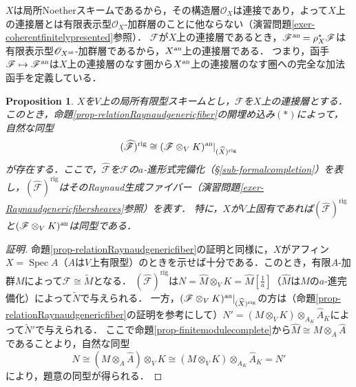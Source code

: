 \documentclass[a4paper,12pt, dvipdfmx]{jsbook}
\def\O{\mathscr{O}}
\def\til#1{\widetilde{#1}}%
\def\rig{\mathop{\mathrm{rig}}\nolimits}
\def\Spec{\mathop{\mathrm{Spec}}\nolimits}
\def\an{\textsl{an}}
\theoremstyle{plain}
\newtheorem{prop}[thm]{\bfseries Proposition}
\theoremstyle{definition}
\begin{document}
$X$は局所Noetherスキームであるから，その構造層$\O_X$は連接であり，よって$X$上の連接層とは有限表示型$\O_X$-加群層のことに他ならない（演習問題\ref{exer-coherentfinitelypresented}参照）．
$\mathscr{F}$が$X$上の連接層であるとき，$\mathscr{F}^{\an}=\rho^{\ast}_X\mathscr{F}$は有限表示型$\O_{X^{\an}}$-加群層であるから，$X^{\an}$上の連接層である．
つまり，函手$\mathscr{F}\mapsto\mathscr{F}^{\an}$は$X$上の連接層のなす圏から$X^{\an}$上の連接層のなす圏への完全な加法函手を定義している．

\begin{prop}\label{prop-relationRaynaudgenericfibersheaf}{\rm 
$X$を$V$上の局所有限型スキームとし，$\mathscr{F}$を$X$上の連接層とする．
このとき，命題\ref{prop-relationRaynaudgenericfiber}の開埋め込み$(\ast)$によって，自然な同型
$$
(\widehat{\mathscr{F}})^{\rig}\cong(\mathscr{F}\otimes_VK)^{\an}|_{(\widehat{X})^{\rig}}
$$
が存在する．ここで，$\widehat{\mathscr{F}}$を$\mathscr{F}$の$a$-進形式完備化（\S\ref{sub-formalcompletion}）を表し，$(\widehat{\mathscr{F}})^{\rig}$はそのRaynaud生成ファイバー（演習問題\ref{exer-Raynaudgenericfibersheaves}参照）を表す．
特に，$X$が$V$上固有であれば$(\widehat{\mathscr{F}})^{\rig}$と$(\mathscr{F}\otimes_VK)^{\an}$は同型である．}
\end{prop}

\begin{proof}[証明]
命題\ref{prop-relationRaynaudgenericfiber}の証明と同様に，$X$がアフィン$X=\Spec A$（$A$は$V$上有限型）のときを示せば十分である．このとき，有限$A$-加群$M$によって$\mathscr{F}\cong\til{M}$となる．
$(\widehat{\mathscr{F}})^{\rig}$は$N=\widehat{M}\otimes_VK=\widehat{M}[\frac{1}{a}]$（$\widehat{M}$は$M$の$a$-進完備化）によって$\til{N}$で与えられる．
一方，$(\mathscr{F}\otimes_VK)^{\an}|_{(\widehat{X})^{\rig}}$の方は（命題\ref{prop-relationRaynaudgenericfiber}の証明を参考にして）$N'=(M\otimes_VK)\otimes_{A_K}\widehat{A}_K$によって$\til{N}'$で与えられる．
ここで命題\ref{prop-finitemodulecomplete}から$\widehat{M}\cong M\otimes_A\widehat{A}$であることより，自然な同型
$$
N\cong(M\otimes_A\widehat{A})\otimes_VK\cong(M\otimes_VK)\otimes_{A_K}\widehat{A}_K=N'
$$
により，題意の同型が得られる．
\end{proof}
\end{document}
